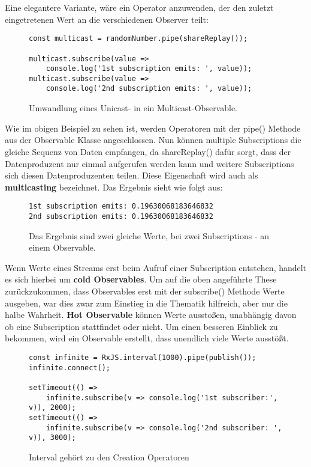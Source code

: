 \noindent
Eine elegantere Variante, wäre ein Operator anzuwenden, der den zuletzt eingetretenen Wert an die verschiedenen Observer teilt:

\begin{figure}[H]
\begin{lstlisting}[basicstyle=\small]
const multicast = randomNumber.pipe(shareReplay());

multicast.subscribe(value =>
    console.log('1st subscription emits: ', value));
multicast.subscribe(value =>
    console.log('2nd subscription emits: ', value));
\end{lstlisting}
\caption{Umwandlung eines Unicast- in ein Multicast-Observable.}
\label{unicast-transformation}
\end{figure}

\noindent
Wie im obigen Beispiel zu sehen ist, werden Operatoren mit der pipe() Methode aus der Observable Klasse angeschlossen. Nun können multiple Subscriptions die gleiche Sequenz von Daten empfangen, da shareReplay() dafür sorgt, dass der Datenproduzent nur einmal aufgerufen werden kann und weitere Subscriptions sich diesen Datenproduzenten teilen. Diese Eigenschaft wird auch als \textbf{multicasting} bezeichnet. Das Ergebnis sieht wie folgt aus:

\begin{figure}[H]
\begin{lstlisting}
1st subscription emits: 0.19630068183646832
2nd subscription emits: 0.19630068183646832
\end{lstlisting}
\caption{Das Ergebnis sind zwei gleiche Werte, bei zwei Subscriptions - an einem Observable.}
\end{figure}

\noindent
Wenn Werte eines Streams erst beim Aufruf einer Subscription entstehen, handelt es sich hierbei um \textbf{cold Observables}\cite{hot-vs-cold}. Um auf die oben angeführte These zurückzukommen, dass Observables erst mit der subscribe() Methode Werte ausgeben, war dies zwar zum Einstieg in die Thematik hilfreich, aber nur die halbe Wahrheit. \textbf{Hot Observable} können Werte ausstoßen, unabhängig davon ob eine Subscription stattfindet oder nicht. Um einen besseren Einblick zu bekommen, wird ein Observable erstellt, dass unendlich viele Werte ausstößt.

\begin{figure}[H]
\begin{lstlisting}[basicstyle=\small]
const infinite = RxJS.interval(1000).pipe(publish());
infinite.connect();

setTimeout(() =>
    infinite.subscribe(v => console.log('1st subscriber:', v)), 2000);
setTimeout(() =>
    infinite.subscribe(v => console.log('2nd subscriber: ', v)), 3000);
\end{lstlisting}
\caption{Interval gehört zu den Creation Operatoren}
\label{interval-obs}
\end{figure}

